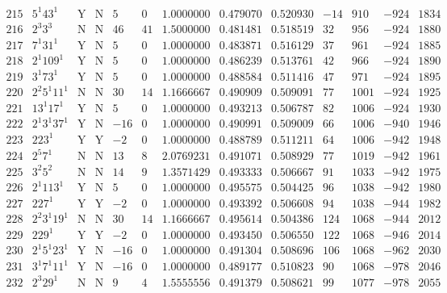 \documentclass[11pt,reqno,a4letter]{article}
\numberwithin{equation}{section}
\numberwithin{figure}{section}
\numberwithin{table}{section}
\theoremstyle{plain}
\numberwithin{theorem}{section}
\theoremstyle{definition}
\begin{document}
\begin{table}[ht]
\begin{equation*}
{\begin{array}{cc|cc|ccc|cc|cccc}
 215 & 5^1 43^1 & \text{Y} & \text{N} & 5 & 0 & 1.0000000 & 0.479070 & 0.520930 & -14 & 910 & -924 & 1834 \\
 216 & 2^3 3^3 & \text{N} & \text{N} & 46 & 41 & 1.5000000 & 0.481481 & 0.518519 & 32 & 956 & -924 & 1880 \\
 217 & 7^1 31^1 & \text{Y} & \text{N} & 5 & 0 & 1.0000000 & 0.483871 & 0.516129 & 37 & 961 & -924 & 1885 \\
 218 & 2^1 109^1 & \text{Y} & \text{N} & 5 & 0 & 1.0000000 & 0.486239 & 0.513761 & 42 & 966 & -924 & 1890 \\
 219 & 3^1 73^1 & \text{Y} & \text{N} & 5 & 0 & 1.0000000 & 0.488584 & 0.511416 & 47 & 971 & -924 & 1895 \\
 220 & 2^2 5^1 11^1 & \text{N} & \text{N} & 30 & 14 & 1.1666667 & 0.490909 & 0.509091 & 77 & 1001 & -924 & 1925 \\
 221 & 13^1 17^1 & \text{Y} & \text{N} & 5 & 0 & 1.0000000 & 0.493213 & 0.506787 & 82 & 1006 & -924 & 1930 \\
 222 & 2^1 3^1 37^1 & \text{Y} & \text{N} & -16 & 0 & 1.0000000 & 0.490991 & 0.509009 & 66 & 1006 & -940 & 1946 \\
 223 & 223^1 & \text{Y} & \text{Y} & -2 & 0 & 1.0000000 & 0.488789 & 0.511211 & 64 & 1006 & -942 & 1948 \\
 224 & 2^5 7^1 & \text{N} & \text{N} & 13 & 8 & 2.0769231 & 0.491071 & 0.508929 & 77 & 1019 & -942 & 1961 \\
 225 & 3^2 5^2 & \text{N} & \text{N} & 14 & 9 & 1.3571429 & 0.493333 & 0.506667 & 91 & 1033 & -942 & 1975 \\
 226 & 2^1 113^1 & \text{Y} & \text{N} & 5 & 0 & 1.0000000 & 0.495575 & 0.504425 & 96 & 1038 & -942 & 1980 \\
 227 & 227^1 & \text{Y} & \text{Y} & -2 & 0 & 1.0000000 & 0.493392 & 0.506608 & 94 & 1038 & -944 & 1982 \\
 228 & 2^2 3^1 19^1 & \text{N} & \text{N} & 30 & 14 & 1.1666667 & 0.495614 & 0.504386 & 124 & 1068 & -944 & 2012 \\
 229 & 229^1 & \text{Y} & \text{Y} & -2 & 0 & 1.0000000 & 0.493450 & 0.506550 & 122 & 1068 & -946 & 2014 \\
 230 & 2^1 5^1 23^1 & \text{Y} & \text{N} & -16 & 0 & 1.0000000 & 0.491304 & 0.508696 & 106 & 1068 & -962 & 2030 \\
 231 & 3^1 7^1 11^1 & \text{Y} & \text{N} & -16 & 0 & 1.0000000 & 0.489177 & 0.510823 & 90 & 1068 & -978 & 2046 \\
 232 & 2^3 29^1 & \text{N} & \text{N} & 9 & 4 & 1.5555556 & 0.491379 & 0.508621 & 99 & 1077 & -978 & 2055 \\

\end{array}}
\end{equation*}
\end{table}
\end{document}
